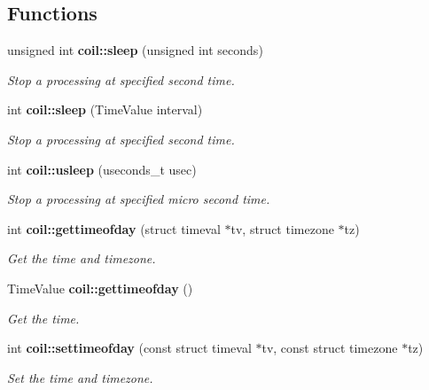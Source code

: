 \subsection*{Functions}
\begin{DoxyCompactItemize}
\item 
unsigned int {\bf coil::sleep} (unsigned int seconds)
\begin{DoxyCompactList}\small\item\em Stop a processing at specified second time. \item\end{DoxyCompactList}\item 
int {\bf coil::sleep} (TimeValue interval)
\begin{DoxyCompactList}\small\item\em Stop a processing at specified second time. \item\end{DoxyCompactList}\item 
int {\bf coil::usleep} (useconds\_\-t usec)
\begin{DoxyCompactList}\small\item\em Stop a processing at specified micro second time. \item\end{DoxyCompactList}\item 
int {\bf coil::gettimeofday} (struct timeval $\ast$tv, struct timezone $\ast$tz)
\begin{DoxyCompactList}\small\item\em Get the time and timezone. \item\end{DoxyCompactList}\item 
TimeValue {\bf coil::gettimeofday} ()
\begin{DoxyCompactList}\small\item\em Get the time. \item\end{DoxyCompactList}\item 
int {\bf coil::settimeofday} (const struct timeval $\ast$tv, const struct timezone $\ast$tz)
\begin{DoxyCompactList}\small\item\em Set the time and timezone. \item\end{DoxyCompactList}\end{DoxyCompactItemize}

